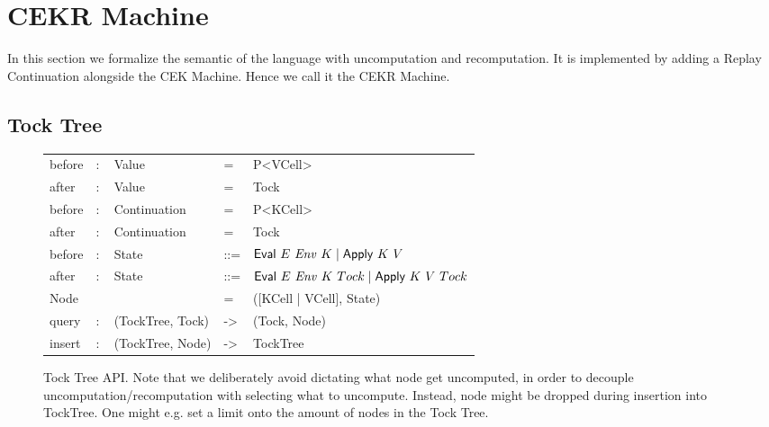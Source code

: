 \section{CEKR Machine}
In this section we formalize the semantic of the language with uncomputation and recomputation. It is implemented by adding a Replay Continuation alongside the CEK Machine.
Hence we call it the CEKR Machine.

\subsection{Tock Tree}
\begin{figure}
	\begin{tabular}{p{6em} p{2.6em} p{7em} p{1em} p{}}
	before & $:$ & Value & = & P<VCell> \\
	after & $:$ & Value & = & Tock \\
	before & $:$ & Continuation & = & P<KCell> \\
	after & $:$ & Continuation & = & Tock \\
	before & $:$ & State & ::= & $\textsf{Eval}~E~\mathit{Env}~K \mid \textsf{Apply}~K~V $ \\
	after & $:$ & State & ::= & $\textsf{Eval}~E~\mathit{Env}~K~Tock \mid \textsf{Apply}~K~V~Tock $ \\
	Node & & & = & ([KCell | VCell], State) \\
	query & $:$ & (TockTree, Tock) & -> & (Tock, Node) \\
	insert & $:$ & (TockTree, Node) & -> & TockTree \\
	\end{tabular}
	\caption{Tock Tree API. Note that we deliberately avoid dictating what node get uncomputed, in order to decouple uncomputation/recomputation with selecting what to uncompute. Instead, node might be dropped during insertion into TockTree. One might e.g. set a limit onto the amount of nodes in the Tock Tree. }
\end{figure}

